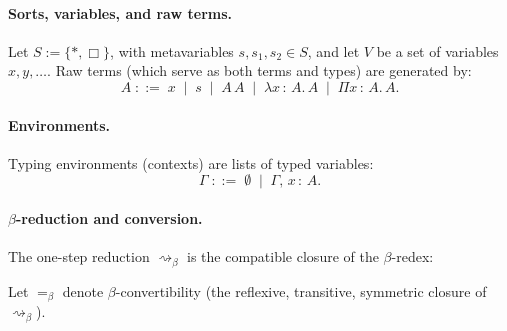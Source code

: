 \documentclass[11pt]{article}
\theoremstyle{definition}
\theoremstyle{plain}
\theoremstyle{remark}
\theoremstyle{plain}
\newcommand{\Boxsort}{\Box}
\newcommand{\astsort}{\ast}
\newcommand{\rsq}{\rightsquigarrow}
\newcommand{\of}{\,{:}\,}
\begin{document}
\paragraph{Sorts, variables, and raw terms.}
Let $S := \{\astsort,\Boxsort\}$, with metavariables $s,s_1,s_2\in S$, and let $V$ be a set
of variables $x,y,\dots$.
Raw terms (which serve as both terms and types) are generated by:
\[
  A \;::=\; x \;\mid\; s \;\mid\; A\,A \;\mid\; \lambda x \of A.\,A \;\mid\; \Pi x \of A.\,A .
\]

\paragraph{Environments.}
Typing environments (contexts) are lists of typed variables:
\[
  \Gamma \;::=\; \emptyset \;\mid\; \Gamma,\,x \of A .
\]

\paragraph{$\beta$-reduction and conversion.}
The one-step reduction $\rsq_\beta$ is the compatible closure of the $\beta$-redex:
Let $=_\beta$ denote $\beta$-convertibility (the reflexive, transitive, symmetric closure of
$\rsq_\beta$).
\end{document}
